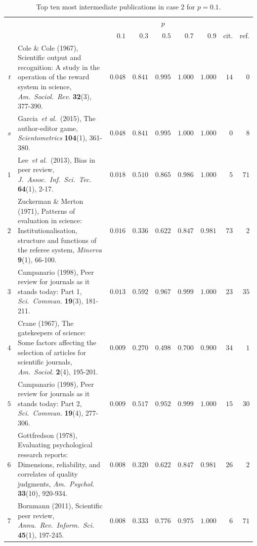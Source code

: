 \documentclass[9pt,twocolumn,twoside]{pnas-alt} %
\theoremstyle{definition}
\renewcommand{\etal}{~\emph{et al.}\xspace}
\begin{document}
\begin{sansmath}\begin{table}[b!]%
  \caption{Top ten most intermediate publications in case 2 for $p = 0.1$.}
  \begin{tabular}{rp{9.75cm}rrrrrrr}
    & & \multicolumn{5}{c}{$p$} \\\cmidrule{3-7}
    & & $0.1$ & $0.3$ & $0.5$ & $0.7$ & $0.9$ & cit. & ref. \\\midrule
    $t$ & Cole \& Cole (1967), Scientific output and recognition: A study in the operation of the reward system in science, \textit{Am.\ Sociol.\ Rev.} \textbf{32}(3), 377-390. & $0.048$ & $0.841$ & $0.995$ & $1.000$ & $1.000$ & $14$ & $0$ \\
    $s$ & Garcia\etal~(2015), The author-editor game, \textit{Scientometrics} \textbf{104}(1), 361-380. & $0.048$ & $0.841$ & $0.995$ & $1.000$ & $1.000$ & $0$ & $8$ \\\midrule
    $1$ & Lee\etal~(2013), Bias in peer review, \textit{J.\ Assoc.\ Inf.\ Sci.\ Tec.} \textbf{64}(1), 2-17. & $0.018$ & $0.510$ & $0.865$ & $0.986$ & $1.000$ & $5$ & $71$ \\
    $2$ & Zuckerman \& Merton (1971), Patterns of evaluation in science: Institutionalisation, structure and functions of the referee system, \textit{Minerva} \textbf{9}(1), 66-100. & $0.016$ & $0.336$ & $0.622$ & $0.847$ & $0.981$ & $73$ & $2$ \\
    $3$ & Campanario (1998), Peer review for journals as it stands today: Part 1, \textit{Sci.\ Commun.} \textbf{19}(3), 181-211. & $0.013$ & $0.592$ & $0.967$ & $0.999$ & $1.000$ & $23$ & $35$ \\
    $4$ & Crane (1967), The gatekeepers of science: Some factors affecting the selection of articles for scientific journals, \textit{Am.\ Sociol.} \textbf{2}(4), 195-201. & $0.009$ & $0.270$ & $0.498$ & $0.700$ & $0.900$ & $34$ & $1$ \\
    $5$ & Campanario (1998), Peer review for journals as it stands today: Part 2, \textit{Sci.\ Commun.} \textbf{19}(4), 277-306. & $0.009$ & $0.517$ & $0.952$ & $0.999$ & $1.000$ & $15$ & $30$ \\
    $6$ & Gottfredson (1978), Evaluating psychological research reports: Dimensions, reliability, and correlates of quality judgments, \textit{Am.\ Psychol.} \textbf{33}(10), 920-934. & $0.008$ & $0.320$ & $0.622$ & $0.847$ & $0.981$ & $26$ & $2$ \\
    $7$ & Bornmann (2011), Scientific peer review, \textit{Annu.\ Rev.\ Inform.\ Sci.} \textbf{45}(1), 197-245. & $0.008$ & $0.333$ & $0.776$ & $0.975$ & $1.000$ & $6$ & $71$ \\

\end{tabular}
\end{table}
\end{sansmath}
\end{document}

